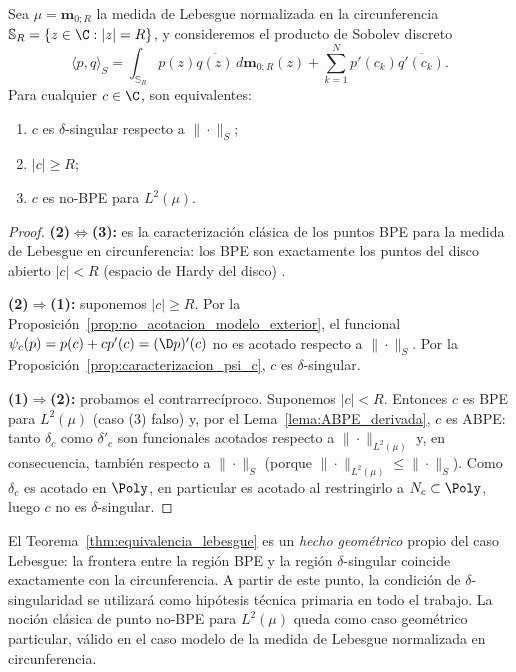 \begin{thm}\label{thm:equivalencia_lebesgue}
	Sea $\mu=\mathbf m_{0;R}$ la medida de Lebesgue normalizada en
	la circunferencia $\mathbb{S}_R=\{z\in\C:|z|=R\}$, y consideremos el producto
	de Sobolev discreto
	\[
		\langle p,q\rangle_S
		=
		\int_{\mathbb{S}_R}p(z)\overline{q(z)}\,d\mathbf m_{0;R}(z)
		+
		\sum_{k=1}^N p'(c_k)\overline{q'(c_k)}.
	\]
	Para cualquier $c\in\C$, son equivalentes:
	\begin{enumerate}
		\item $c$ es $\delta$-singular respecto a $\|\cdot\|_S$;
		\item $|c|\ge R$;
		\item $c$ es no-BPE para $L^2(\mu)$.
	\end{enumerate}
\end{thm}

\begin{proof}
	\textbf{(2)$\iff$(3):} es la caracterización clásica de los puntos BPE
	para la medida de Lebesgue en circunferencia: los BPE son exactamente
	los puntos del disco abierto $|c|<R$ (espacio de Hardy del disco)
	\cite{duren1970theory,szego1975orthogonal}.

	\textbf{(2)$\Rightarrow$(1):} suponemos $|c|\ge R$.
	Por la Proposición~\ref{prop:no_acotacion_modelo_exterior},
	el funcional $\psi_c(p)=p(c)+cp'(c)=(\D p)'(c)$ no es acotado
	respecto a $\|\cdot\|_S$. Por la
	Proposición~\ref{prop:caracterizacion_psi_c}, $c$ es $\delta$-singular.

	\textbf{(1)$\Rightarrow$(2):} probamos el contrarrecíproco.
	Suponemos $|c|<R$. Entonces $c$ es BPE para $L^2(\mu)$ (caso (3)
	falso) y, por el Lema~\ref{lema:ABPE_derivada}, $c$ es ABPE: tanto $\delta_c$
	como $\delta'_c$ son funcionales acotados respecto a $\|\cdot\|_{L^2(\mu)}$
	y, en consecuencia, también respecto a $\|\cdot\|_S$ (porque
	$\|\cdot\|_{L^2(\mu)}\le\|\cdot\|_S$). Como $\delta_c$ es acotado en
	$\Poly$, en particular es acotado al restringirlo a $N_c\subset\Poly$,
	luego $c$ no es $\delta$-singular.
\end{proof}

\begin{rmk}\label{rem:hipotesis_delta_singular}
	El Teorema~\ref{thm:equivalencia_lebesgue} es un \emph{hecho geométrico}
	propio del caso Lebesgue: la frontera entre la región BPE y la región
	$\delta$-singular coincide exactamente con la circunferencia.
	A partir de este punto, la condición de $\delta$-singularidad se utilizará
	como hipótesis técnica primaria en todo el trabajo. La noción clásica
	de punto no-BPE para $L^2(\mu)$ queda como caso geométrico particular,
	válido en el caso modelo de la medida de Lebesgue normalizada en circunferencia.
\end{rmk}

